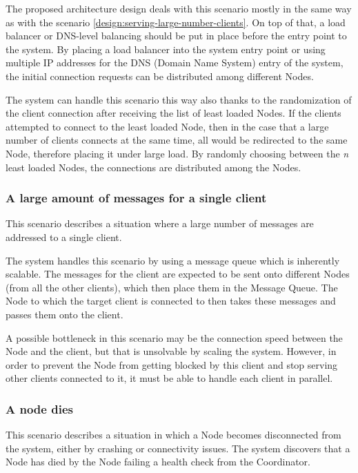 The proposed architecture design deals with this scenario mostly in the same way as with the scenario \ref{design:serving-large-number-clients}. On top of that, a load balancer or DNS-level balancing should be put in place before the entry point to the system. By placing a load balancer into the system entry point or using multiple IP addresses for the DNS (Domain Name System) entry of the system, the initial connection requests can be distributed among different Nodes.

The system can handle this scenario this way also thanks to the randomization of the client connection after receiving the list of least loaded Nodes. If the clients attempted to connect to the least loaded Node, then in the case that a large number of clients connects at the same time, all would be redirected to the same Node, therefore placing it under large load. By randomly choosing between the \textit{n} least loaded Nodes, the connections are distributed among the Nodes.

\subsubsection{A large amount of messages for a single client}
This scenario describes a situation where a large number of messages are addressed to a single client.

The system handles this scenario by using a message queue which is inherently scalable. The messages for the client are expected to be sent onto different Nodes (from all the other clients), which then place them in the Message Queue. The Node to which the target client is connected to then takes these messages and passes them onto the client.

A possible bottleneck in this scenario may be the connection speed between the Node and the client, but that is unsolvable by scaling the system. However, in order to prevent the Node from getting blocked by this client and stop serving other clients connected to it, it must be able to handle each client in parallel.

\subsubsection{A node dies}
This scenario describes a situation in which a Node becomes disconnected from the system, either by crashing or connectivity issues. The system discovers that a Node has died by the Node failing a health check from the Coordinator.

